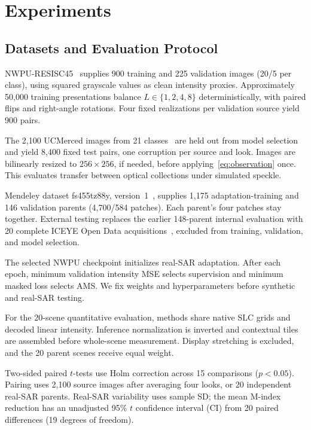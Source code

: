 \documentclass[journal]{IEEEtran}
\newcommand{\rev}[1]{{\color{RevisionBlue}#1}}
\newcommand{\condensed}[1]{{\color{CondensedGreen}#1}}
\newcommand{\rev}[1]{#1}
\newcommand{\condensed}[1]{#1}
\begin{document}
\section{Experiments}
\subsection{Datasets and Evaluation Protocol}
\condensed{NWPU-RESISC45~\cite{cheng2017} supplies 900 training and 225 validation images (20/5 per class), using squared grayscale values as clean intensity proxies. \rev{Approximately 50,000} training presentations balance \(L\in\{1,2,4,8\}\) deterministically, with paired flips and right-angle rotations. Four fixed realizations per validation source yield 900 pairs.}

\condensed{The 2,100 UCMerced images from 21 classes~\cite{yang2010} are held out from model selection and yield 8,400 fixed test pairs, one corruption per source and look. Images are bilinearly resized to \(256\times256\), if needed, before applying~\eqref{eq:observation} once. This evaluates transfer between optical collections under simulated speckle.}

\rev{Mendeley dataset fs455tz88y, version~1~\cite{vasquez2024data}, supplies 1,175 adaptation-training and 146 validation parents (4,700/584 patches). Each parent's four patches stay together. External testing replaces the earlier 148-parent internal evaluation with 20 complete ICEYE Open Data acquisitions~\cite{iceyeOpenData}, excluded from training, validation, and model selection.}

\rev{The selected NWPU checkpoint initializes real-SAR adaptation. After each epoch, minimum validation intensity MSE selects supervision and minimum masked loss selects AMS. We fix weights and hyperparameters before synthetic and real-SAR testing.}

\rev{For the 20-scene quantitative evaluation, methods share native SLC grids and decoded linear intensity. Inference normalization is inverted and contextual tiles are assembled before whole-scene measurement. Display stretching is excluded, and the 20 parent scenes receive equal weight.}

\rev{Two-sided paired \(t\)-tests use Holm correction across 15 comparisons (\(p<0.05\)). Pairing uses 2,100 source images after averaging four looks, or 20 independent real-SAR parents. Real-SAR variability uses sample SD; the mean M-index reduction has an unadjusted 95\% \(t\) confidence interval (CI) from 20 paired differences (19 degrees of freedom).}
\end{document}
